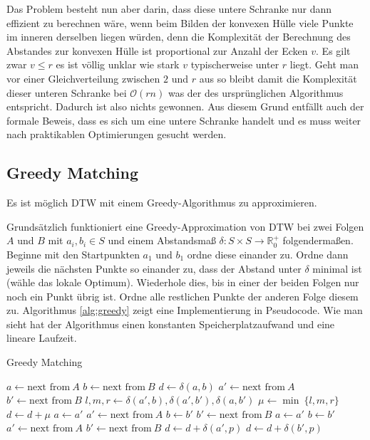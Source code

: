 Das Problem besteht nun aber darin, dass diese untere Schranke nur dann effizient zu berechnen wäre, wenn beim Bilden der konvexen Hülle viele Punkte im inneren derselben liegen würden, denn die Komplexität der Berechnung des Abstandes zur konvexen Hülle ist proportional zur Anzahl der Ecken $v$. Es gilt zwar $v \leq r$ es ist völlig unklar wie stark $v$ typischerweise unter $r$ liegt. Geht man vor einer Gleichverteilung zwischen $2$ und $r$ aus so bleibt damit die Komplexität dieser unteren Schranke bei \( \mathcal{O}(rn) \) was der des ursprünglichen Algorithmus entspricht. Dadurch ist also nichts gewonnen. Aus diesem Grund entfällt auch der formale Beweis, dass es sich um eine untere Schranke handelt und es muss weiter nach praktikablen Optimierungen gesucht werden.

\subsection{Greedy Matching} %
\label{sec:greedy}

Es ist möglich DTW mit einem Greedy-Algorithmus \cite[S.370ff.]{algorithms} zu approximieren.

Grundsätzlich funktioniert eine Greedy-Approximation von DTW bei zwei Folgen $A$ und $B$ mit \(a_i,b_i \in S\) und einem Abstandsmaß \(\delta:S\times S \rightarrow \mathbb{R}_0^+\) folgendermaßen. Beginne mit den Startpunkten $a_1$ und $b_1$ ordne diese einander zu. Ordne dann jeweils die nächsten Punkte so einander zu, dass der Abstand unter \(\delta\) minimal ist (wähle das lokale Optimum). Wiederhole dies, bis in einer der beiden Folgen nur noch ein Punkt übrig ist. Ordne alle restlichen Punkte der anderen Folge diesem zu. Algorithmus \ref{alg:greedy} zeigt eine Implementierung in Pseudocode.
Wie man sieht hat der Algorithmus einen konstanten Speicherplatzaufwand und eine lineare Laufzeit.

\begin{algorithm}
  \caption{Greedy Matching}
  \label{alg:greedy}
  \begin{algorithmic}
    \STATE $a \gets \text{next from}~A$
    \STATE $b \gets \text{next from}~B$
    \STATE $d \gets \delta(a,b)$
    \STATE $a' \gets \text{next from}~A$
    \STATE $b' \gets \text{next from}~B$
      \STATE $l, m, r \gets \delta(a',b), \delta(a', b'), \delta(a, b')$
      \STATE $\mu \gets \min ~\{l, m, r\}$
      \STATE $d \gets d + \mu$
        \STATE $a \gets a'$
        \STATE $a' \gets \text{next from}~A$
        \STATE $b \gets b'$
        \STATE $b' \gets \text{next from}~B$
      \ELSE
        \STATE $a \gets a'$
        \STATE $b \gets b'$
        \STATE $a' \gets \text{next from}~A$
        \STATE $b' \gets \text{next from}~B$
      \ENDIF
    \ENDWHILE
        \STATE $d \gets d + \delta(a',p)$
      \ENDFOR
        \STATE $d \gets d + \delta(b',p)$
      \ENDFOR
    \ENDIF
  \end{algorithmic}
\end{algorithm}

